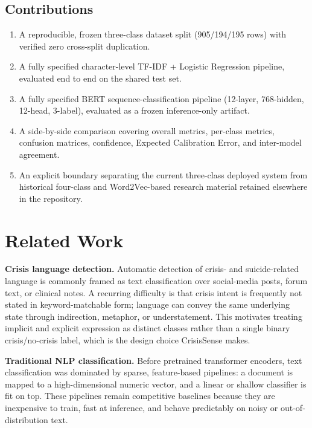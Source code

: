 \documentclass[12pt,a4paper]{article}
\begin{document}
\subsection{Contributions}

\begin{enumerate}[nosep]
  \item A reproducible, frozen three-class dataset split (905/194/195 rows) with verified zero cross-split duplication.
  \item A fully specified character-level TF-IDF + Logistic Regression pipeline, evaluated end to end on the shared test set.
  \item A fully specified BERT sequence-classification pipeline (12-layer, 768-hidden, 12-head, 3-label), evaluated as a frozen inference-only artifact.
  \item A side-by-side comparison covering overall metrics, per-class metrics, confusion matrices, confidence, Expected Calibration Error, and inter-model agreement.
  \item An explicit boundary separating the current three-class deployed system from historical four-class and Word2Vec-based research material retained elsewhere in the repository.
\end{enumerate}

\section{Related Work}

\textbf{Crisis language detection.} Automatic detection of crisis- and suicide-related language is commonly framed as text classification over social-media posts, forum text, or clinical notes. A recurring difficulty is that crisis intent is frequently not stated in keyword-matchable form; language can convey the same underlying state through indirection, metaphor, or understatement. This motivates treating implicit and explicit expression as distinct classes rather than a single binary crisis/no-crisis label, which is the design choice CrisisSense makes.

\textbf{Traditional NLP classification.} Before pretrained transformer encoders, text classification was dominated by sparse, feature-based pipelines: a document is mapped to a high-dimensional numeric vector, and a linear or shallow classifier is fit on top. These pipelines remain competitive baselines because they are inexpensive to train, fast at inference, and behave predictably on noisy or out-of-distribution text.
\end{document}
